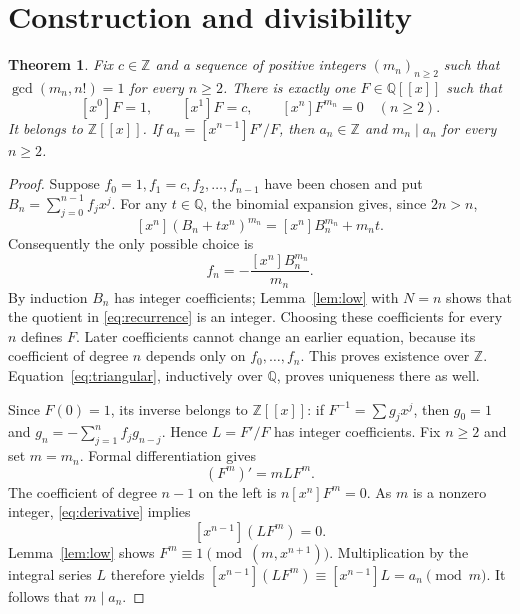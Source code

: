 \documentclass[11pt]{article}
\newtheorem{theorem}{Theorem}
\newcommand{\coeff}[1]{[x^{#1}]}
\begin{document}
\section{Construction and divisibility}
\begin{theorem}\label{thm:general}
Fix $c\in\mathbb Z$ and a sequence of positive integers $(m_n)_{n\ge2}$
such that $\gcd(m_n,n!)=1$ for every $n\ge2$.
There is exactly one $F\in\mathbb Q[[x]]$ such that
\[
 \coeff0F=1,\qquad\coeff1F=c,\qquad
 \coeff nF^{m_n}=0\quad(n\ge2).
\]
It belongs to $\mathbb Z[[x]]$. If $a_n=\coeff{n-1}F'/F$, then
$a_n\in\mathbb Z$ and $m_n\mid a_n$ for every $n\ge2$.
\end{theorem}
\begin{proof}
Suppose $f_0=1,f_1=c,f_2,\ldots,f_{n-1}$ have been chosen and put
$B_n=\sum_{j=0}^{n-1}f_jx^j$. For any $t\in\mathbb Q$, the binomial
expansion gives, since $2n>n$,
\begin{equation}\label{eq:triangular}
 \coeff n(B_n+tx^n)^{m_n}=\coeff nB_n^{m_n}+m_nt.
\end{equation}
Consequently the only possible choice is
\begin{equation}\label{eq:recurrence}
 f_n=-\frac{\coeff nB_n^{m_n}}{m_n}.
\end{equation}
By induction $B_n$ has integer coefficients; Lemma~\ref{lem:low} with
$N=n$ shows that the quotient in \eqref{eq:recurrence} is an integer.
Choosing these coefficients for every $n$ defines $F$. Later coefficients
cannot change an earlier equation, because its coefficient of degree $n$
depends only on $f_0,\ldots,f_n$. This proves existence over $\mathbb Z$.
Equation~\eqref{eq:triangular}, inductively over $\mathbb Q$, proves
uniqueness there as well.

Since $F(0)=1$, its inverse belongs to $\mathbb Z[[x]]$: if
$F^{-1}=\sum g_jx^j$, then $g_0=1$ and
$g_n=-\sum_{j=1}^nf_jg_{n-j}$. Hence $L=F'/F$ has integer coefficients.
Fix $n\ge2$ and set $m=m_n$. Formal differentiation gives
\begin{equation}\label{eq:derivative}
 (F^m)'=mLF^m.
\end{equation}
The coefficient of degree $n-1$ on the left is $n\coeff nF^m=0$.
As $m$ is a nonzero integer, \eqref{eq:derivative} implies
\[
 \coeff{n-1}(LF^m)=0.
\]
Lemma~\ref{lem:low} shows $F^m\equiv1\pmod{(m,x^{n+1})}$.
Multiplication by the integral series $L$ therefore yields
$\coeff{n-1}(LF^m)\equiv\coeff{n-1}L=a_n\pmod m$.
It follows that $m\mid a_n$.
\end{proof}
\end{document}
